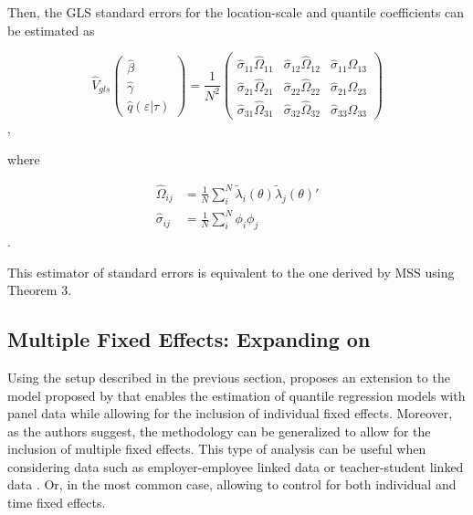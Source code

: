 \documentclass[
  authoryear,
  review,
  1p]{elsarticle}
\begin{document}
Then, the GLS standard errors for the location-scale and quantile
coefficients can be estimated as

\[\hat{V}_{gls}
  \begin{pmatrix}
  \hat\beta \\
  \hat\gamma \\
  \hat q(\varepsilon|\tau)
  \end{pmatrix}
 = \frac{1}{N^2} 
 \begin{pmatrix}
 \hat\sigma_{11} \hat\Omega_{11} & \hat\sigma_{12} \hat\Omega_{12} & \hat\sigma_{11} \hat\Omega_{13} \\
 \hat\sigma_{21} \hat\Omega_{21} & \hat\sigma_{22} \hat\Omega_{22} & \hat\sigma_{21} \hat\Omega_{23} \\
 \hat\sigma_{31} \hat\Omega_{31} & \hat\sigma_{32} \hat\Omega_{32} & \hat\sigma_{33} \hat\Omega_{33}
  \end{pmatrix}
\],

where

\[\begin{aligned}
\hat\Omega_{ij} &= \frac{1}{N} \sum_i^N \tilde \lambda_{i}(\theta) \tilde \lambda_{j}(\theta)' \\
\hat\sigma_{ij} &= \frac{1}{N} \sum_i^N \phi_{i} \phi_{j}
\end{aligned}
\].

This estimator of standard errors is equivalent to the one derived by
MSS using Theorem 3.

\hypertarget{multiple-fixed-effects-expanding-on-mss2019}{%
\subsection{\texorpdfstring{Multiple Fixed Effects: Expanding on
\citet{mss2019}}{Multiple Fixed Effects: Expanding on @mss2019}}\label{multiple-fixed-effects-expanding-on-mss2019}}

Using the setup described in the previous section, \citet{mss2019}
proposes an extension to the model proposed by \citet{he1997} that enables the estimation of quantile regression models with panel data while
allowing for the inclusion of individual fixed effects. Moreover, as the
authors suggest, the methodology can be generalized to allow for the
inclusion of multiple fixed effects. This type of analysis can be useful
when considering data such as employer-employee linked data
\citep{abowed2006} or teacher-student linked data
\citep{harrissass2011}. Or, in the most common case, allowing to control
for both individual and time fixed effects.
\end{document}
